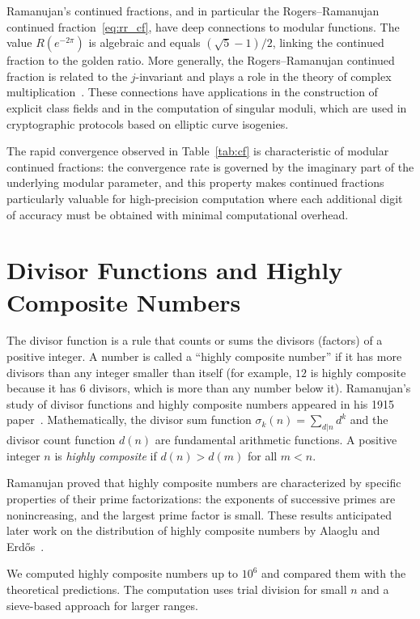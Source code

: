 \documentclass[10pt]{amsart}
\theoremstyle{plain}
\theoremstyle{definition}
\theoremstyle{remark}
\begin{document}
Ramanujan's continued fractions, and in particular the Rogers--\allowbreak Ramanujan
continued fraction~\eqref{eq:rr_cf}, have deep connections to modular
functions. The value $R(e^{-2\pi})$ is algebraic and equals
$(\sqrt{5}-1)/2$, linking the continued fraction to the golden
ratio. More generally, the Rogers--Ramanujan continued fraction is
related to the $j$-invariant and plays a role in the theory of complex
multiplication~\cite{ramanujan_notebooks}. These connections have
applications in the construction of explicit class fields and in the
computation of singular moduli, which are used in cryptographic
protocols based on elliptic curve isogenies.

The rapid convergence observed in Table~\ref{tab:cf} is characteristic
of modular continued fractions: the convergence rate is governed by the
imaginary part of the underlying modular parameter, and this property
makes continued fractions particularly valuable for high-precision
computation where each additional digit of accuracy must be obtained
with minimal computational overhead.

\section{Divisor Functions and Highly Composite Numbers}
\label{sec:divisors}

The divisor function is a rule that counts or sums the divisors (factors) of a positive integer. A number is called a ``highly composite number'' if it has more divisors than any integer smaller than itself (for example, $12$ is highly composite because it has $6$ divisors, which is more than any number below it). Ramanujan's study of divisor functions and highly composite numbers appeared in his 1915 paper~\cite{ramanujan_1915}. Mathematically, the divisor sum function $\sigma_k(n) = \sum_{d|n} d^k$ and the divisor count function $d(n)$ are fundamental arithmetic functions. A positive integer $n$ is \emph{highly composite} if $d(n) > d(m)$ for all $m < n$.

Ramanujan proved that highly composite numbers are characterized by
specific properties of their prime factorizations: the exponents of
successive primes are nonincreasing, and the largest prime factor is
small. These results anticipated later work on the distribution of
highly composite numbers by Alaoglu and Erd\H{o}s~\cite{alaoglu_erds_1944}.

We computed highly composite numbers up to $10^6$ and compared them
with the theoretical predictions. The computation uses trial division
for small $n$ and a sieve-based approach for larger ranges.
\end{document}
